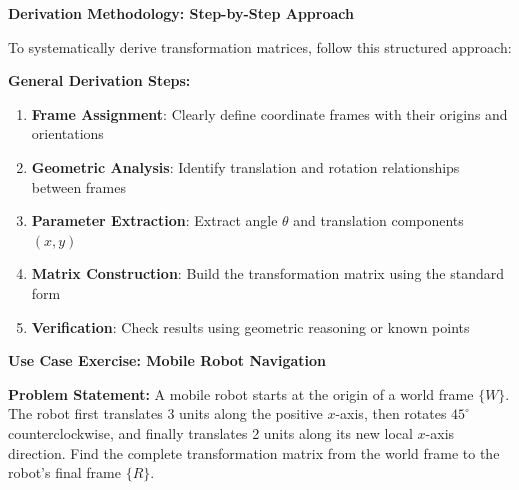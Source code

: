 \documentclass[11pt,a4paper]{article}
\begin{document}
\textbf{Derivation Methodology: Step-by-Step Approach}

To systematically derive transformation matrices, follow this structured approach:

\textbf{General Derivation Steps:}
\begin{enumerate}
    \item \textbf{Frame Assignment}: Clearly define coordinate frames with their origins and orientations
    \item \textbf{Geometric Analysis}: Identify translation and rotation relationships between frames
    \item \textbf{Parameter Extraction}: Extract angle $\theta$ and translation components $(x, y)$
    \item \textbf{Matrix Construction}: Build the transformation matrix using the standard form
    \item \textbf{Verification}: Check results using geometric reasoning or known points
\end{enumerate}

\textbf{Use Case Exercise: Mobile Robot Navigation}

\textbf{Problem Statement:}
A mobile robot starts at the origin of a world frame $\{W\}$. The robot first translates 3 units along the positive $x$-axis, then rotates $45^{\circ}$ counterclockwise, and finally translates 2 units along its new local $x$-axis direction. Find the complete transformation matrix from the world frame to the robot's final frame $\{R\}$.
\end{document}
